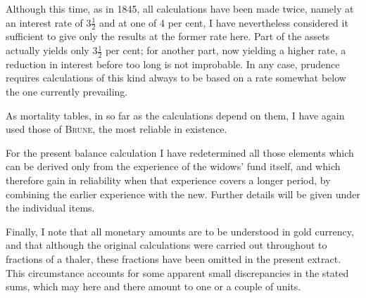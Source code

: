 Although this time, as in 1845, all calculations have been made twice, namely at an interest rate of \(3\tfrac{1}{2}\) and at one of 4 per cent, I have nevertheless considered it sufficient to give only the results at the former rate here. Part of the assets actually yields only \(3\tfrac{1}{2}\) per cent; for another part, now yielding a higher rate, a reduction in interest before too long is not improbable. In any case, prudence requires calculations of this kind always to be based on a rate somewhat below the one currently prevailing.

As mortality tables, in so far as the calculations depend on them, I have again used those of \textsc{Brune}, the most reliable in existence.

For the present balance calculation I have redetermined all those elements which can be derived only from the experience of the widows' fund itself, and which therefore gain in reliability when that experience covers a longer period, by combining the earlier experience with the new. Further details will be given under the individual items.

Finally, I note that all monetary amounts are to be understood in gold currency, and that although the original calculations were carried out throughout to fractions of a thaler, these fractions have been omitted in the present extract. This circumstance accounts for some apparent small
discrepancies in the stated sums, which may here and there amount to one or a couple of units.

